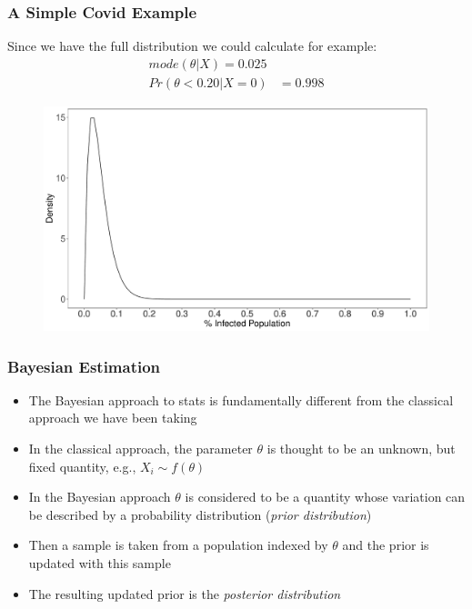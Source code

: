 \documentclass[
  shownotes,
  xcolor={svgnames},
  hyperref={colorlinks,citecolor=DarkBlue,linkcolor=DarkRed,urlcolor=DarkBlue}
  , aspectratio=169]{beamer}
\begin{document}
\begin{frame}[fragile]
\frametitle{A Simple Covid Example}

Since we have the full distribution we could calculate for example:
\begin{align}
mode(\theta|X) = 0.025 \\
Pr(\theta<0.20|X=0) &= 0.998
\end{align}

\begin{figure}[H] \centering
  \centering
  \includegraphics[scale=0.25]{figures/fig_2}
  \\
  \tiny 
\end{figure}


\end{frame}

\begin{frame}[fragile]
\frametitle{Bayesian Estimation}


\begin{itemize}
\item The Bayesian approach to stats is fundamentally different from the classical approach we have been taking
\medskip
\item In the classical approach, the parameter $\theta$ is thought to be an unknown, but fixed quantity, e.g., $X_i\sim f(\theta)$
\medskip
\item In the Bayesian approach $\theta$ is considered to be a quantity whose variation can be described by a probability distribution  ({\it prior distribution})
\medskip
\item Then a sample is taken from a population indexed by $\theta$ and the prior is updated with this sample
\medskip
\item The resulting updated prior is the {\it posterior distribution}
\end{itemize}
\end{frame}
\end{document}

